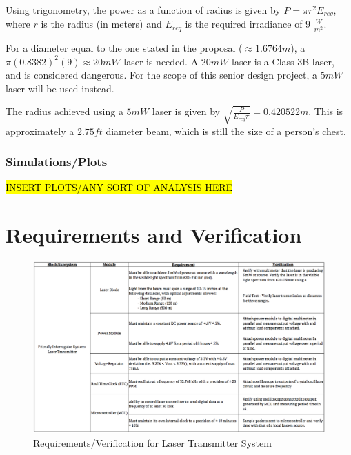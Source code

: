 \documentclass[letterpaper,10pt]{article}
\begin{document}
\begin{spacing}{1.15}
Using trigonometry, the power as a function of radius is given by $P = \pi r^2  E_{req} $, where $r$ is the radius (in meters) and $E_{req}$ is the required irradiance of 9 $\frac{W}{m^2}$. 

For a diameter equal to the one stated in the proposal ($\approx 1.6764 m$), a $\pi (0.8382)^2(9) \approx 20 mW$ laser is needed. A $20 mW$ laser is a Class 3B laser, and is considered dangerous. For the scope of this senior design project, a $5mW$ laser will be used instead. 

The radius achieved using a $5 mW$ laser is given by $\sqrt{\frac{P}{E_{req} \pi}} = 0.420522 m$. This is approximately a $2.75 ft$ diameter beam, which is still the size of a person's chest.

\subsubsection{Simulations/Plots}
\hl{INSERT PLOTS/ANY SORT OF ANALYSIS HERE}


\section{Requirements and Verification}
\begin{figure} [H]
	\centering
	\includegraphics[scale=0.3]{Requirements.png}
	\caption{Requirements/Verification for Laser Transmitter System\label{fig:requirements}}
\end{figure}

\end{spacing}
\end{document}
